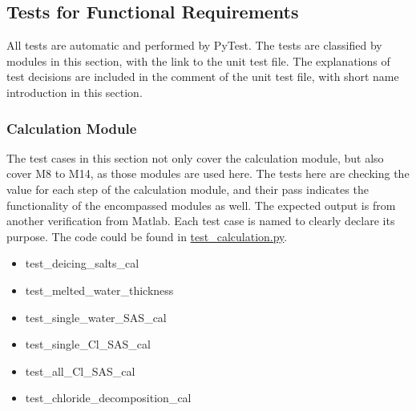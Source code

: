 \documentclass[12pt, titlepage]{article}
\begin{document}

\subsection{Tests for Functional Requirements}
All tests are automatic and performed by PyTest. The tests are classified by modules in this section, with the link to the unit test file. The explanations of test decisions are included in the comment of the unit test file, with short name introduction in this section.


\subsubsection{Calculation Module} \label{CM}
The test cases in this section not only cover the calculation module, but also cover M8 to M14, as those modules are used here. The tests here are checking the value for each step of the calculation module, and their pass indicates the functionality of the encompassed modules as well. The expected output is from another verification from Matlab. Each test case is named to clearly declare its purpose. The code could be found in \href{https://github.com/smiths/BridgeChlorideExposurePredictor/blob/main/src/database/test_calculation.py}{test\_calculation.py}.
\begin{itemize}
\item test\_deicing\_salts\_cal
\item test\_melted\_water\_thickness
\item test\_single\_water\_SAS\_cal
\item test\_single\_Cl\_SAS\_cal
\item test\_all\_Cl\_SAS\_cal
\item test\_chloride\_decomposition\_cal
\end{itemize}
\end{document}
